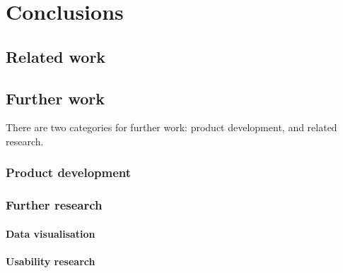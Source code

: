 \chapter{Conclusions}\label{chap:conclusions}





\cite{cummins2014pip-db}
\cite{cummins2014migrating}


\section{Related work}


\section{Further work}

There are two categories for further work: product development, and
related research.

\subsection{Product development}


\subsection{Further research}

\subsubsection*{Data visualisation}

\cite{saraiya2005insight}

\subsubsection*{Usability research}

